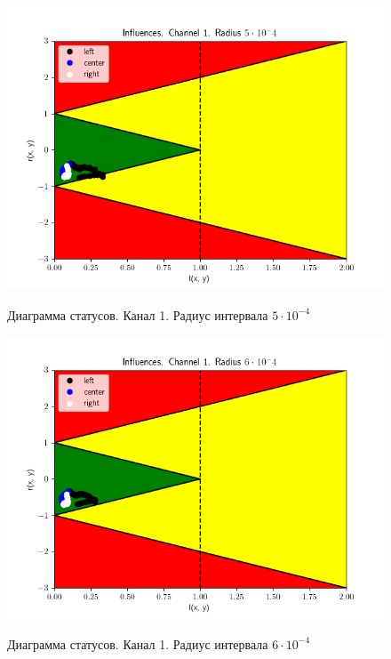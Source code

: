 \begin{figure}[H]
	\begin{center}
		\includegraphics[scale=0.83]{status_ch1_rad5}
		\label{pic:ch15}
		\caption{Диаграмма статусов. Канал 1. Радиус интервала $5 \cdot 10 ^ {-4}$}
	\end{center}
\end{figure}

\begin{figure}[H]
	\begin{center}
		\includegraphics[scale=0.83]{status_ch1_rad6}
		\label{pic:ch16}
		\caption{Диаграмма статусов. Канал 1. Радиус интервала $6 \cdot 10 ^ {-4}$}
	\end{center}
\end{figure}

